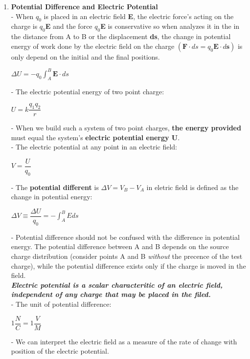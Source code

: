 \documentclass[10pt]{article}
\begin{document}
\begin{enumerate}
	\item \textbf{Potential Difference and Electric Potential}\\	
	- When $q_{0}$ is placed in an electric field \textbf{E}, the electric force's acting on the charge is $q_{0}$\textbf{E} and the force $q_{0}$\textbf{E} is conservative so when analyzes it in the in the distance from A to B or the displacement \textbf{ds}, the change in potential energy of work done by the electric field on the charge $(\textbf{F} \cdot ds = q_{0} \textbf{E} \cdot d \textbf{s})$ is only depend on the initial and the final positions.
	\begin{mybox}
	\begin{center}
	$\Delta U = -q_0 \displaystyle \int_{A}^{B} \textbf{E} \cdot ds$
	\end{center}
	\end{mybox}
	- The electric potential energy of two point charge:
	\begin{mybox}
	\begin{center}
	$U = k \dfrac{q_1q_2}{r}$
	\end{center}
	\end{mybox}
	- When we build such a system of two point  charges, \textbf{the energy provided} must equal the system's \textbf{electric potential energy U}.\\
	- The electric potential at any point in an electric field:
	\begin{mybox}
	\begin{center}
	$V = \dfrac{U}{q_0}$
	\end{center}
	\end{mybox}
	- The \textbf{potential different} is $\Delta V = V_B -V_A$ in eletric field is defined as the change in potential energy:
	\begin{mybox}
	\begin{center}
	$\Delta V \equiv \dfrac{\Delta U}{q_0} = - \displaystyle \int_{A}^{B} E ds$
	\end{center}
	\end{mybox}
	- Potential difference should not be confused with the difference in potential energy. The potential difference between A and B depends on the source charge distribution (consider points A and B \textit{without} the precence of the test charge), while the potential difference exists only if the charge is moved in the field.\\
	\textbf{\textit{Electric potential is a scalar characteritic of an electric field, independent of any charge that may be placed in the filed.}}\\	
	- The unit of potential difference:
	\begin{center}
	$1 \dfrac{N}{C} = 1 \dfrac{V}{M}$
	\end{center}
	- We can interpret the electric field as a measure of the rate of change with position of the electric potential. 
\end{enumerate}	  
\end{document}
